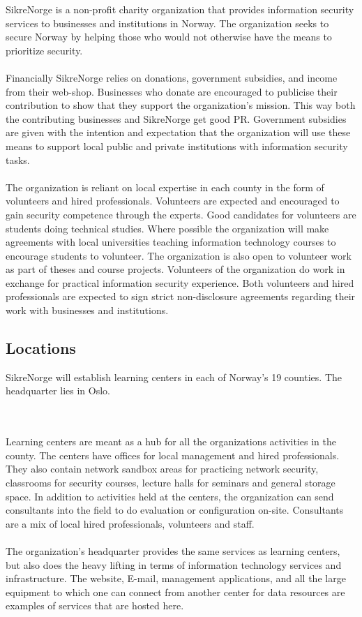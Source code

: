 SikreNorge is a non-profit charity organization that provides information security services to businesses and institutions in Norway. The organization seeks to secure Norway by helping those who would not otherwise have the means to prioritize security.
\\
\\
Financially SikreNorge relies on donations, government subsidies, and income from their web-shop. Businesses who donate are encouraged to publicise their contribution to show that they support the organization's mission. This way both the contributing businesses and SikreNorge get good PR. Government subsidies are given with the intention and expectation that the organization will use these means to support local public and private institutions with information security tasks.
\\
\\
The organization is reliant on local expertise in each county in the form of volunteers and hired professionals. Volunteers are expected and encouraged to gain security competence through the experts. Good candidates for volunteers are students doing technical studies. Where possible the organization will make agreements with local universities teaching information technology courses to encourage students to volunteer. The organization is also open to volunteer work as part of theses and course projects. Volunteers of the organization do work in exchange for practical information security experience. Both volunteers and hired professionals are expected to sign strict non-disclosure agreements regarding their work with businesses and institutions.

\subsection{Locations}

SikreNorge will establish learning centers in each of Norway's 19 counties. The headquarter lies in Oslo.

\\
\\
Learning centers are meant as a hub for all the organizations activities in the county. The centers have offices for local management and hired professionals. They also contain network sandbox areas for practicing network security, classrooms for security courses, lecture halls for seminars and general storage space. In addition to activities held at the centers, the organization can send consultants into the field to do evaluation or configuration on-site. Consultants are a mix of local hired professionals, volunteers and staff.
\\
\\
The organization's headquarter provides the same services as learning centers, but also does the heavy lifting in terms of information technology services and infrastructure. The website, E-mail, management applications, and all the large equipment to which one can connect from another center for data resources are examples of services that are hosted here.

